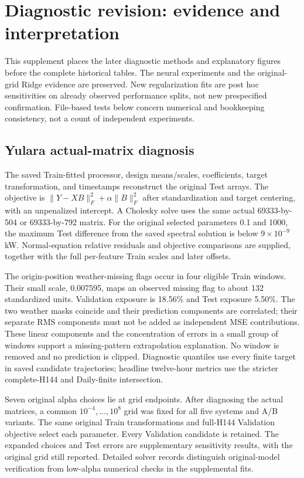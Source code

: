 \section{Diagnostic revision: evidence and interpretation}
This supplement places the later diagnostic methods and explanatory figures before the complete historical tables. The neural experiments and the original-grid Ridge evidence are preserved. New regularization fits are post hoc sensitivities on already observed performance splits, not new prespecified confirmation. File-based tests below concern numerical and bookkeeping consistency, not a count of independent experiments.

\subsection{Yulara actual-matrix diagnosis}
The saved Train-fitted processor, design means/scales, coefficients, target transformation, and timestamps reconstruct the original Test arrays. The objective is $\|Y-XB\|_F^2+\alpha\|B\|_F^2$ after standardization and target centering, with an unpenalized intercept. A Cholesky solve uses the same actual 69333-by-504 or 69333-by-792 matrix. For the original selected parameters 0.1 and 1000, the maximum Test difference from the saved spectral solution is below $9\times10^{-9}$ kW. Normal-equation relative residuals and objective comparisons are supplied, together with the full per-feature Train scales and later offsets.

The origin-position weather-missing flags occur in four eligible Train windows. Their small scale, 0.007595, maps an observed missing flag to about 132 standardized units. Validation exposure is 18.56\% and Test exposure 5.50\%. The two weather masks coincide and their prediction components are correlated; their separate RMS components must not be added as independent MSE contributions. These linear components and the concentration of errors in a small group of windows support a missing-pattern extrapolation explanation. No window is removed and no prediction is clipped. Diagnostic quantiles use every finite target in saved candidate trajectories; headline twelve-hour metrics use the stricter complete-H144 and Daily-finite intersection.

Seven original alpha choices lie at grid endpoints. After diagnosing the actual matrices, a common $10^{-4},\ldots,10^8$ grid was fixed for all five systems and A/B variants. The same original Train transformations and full-H144 Validation objective select each parameter. Every Validation candidate is retained. The expanded choices and Test errors are supplementary sensitivity results, with the original grid still reported. Detailed solver records distinguish original-model verification from low-alpha numerical checks in the supplemental fits.

